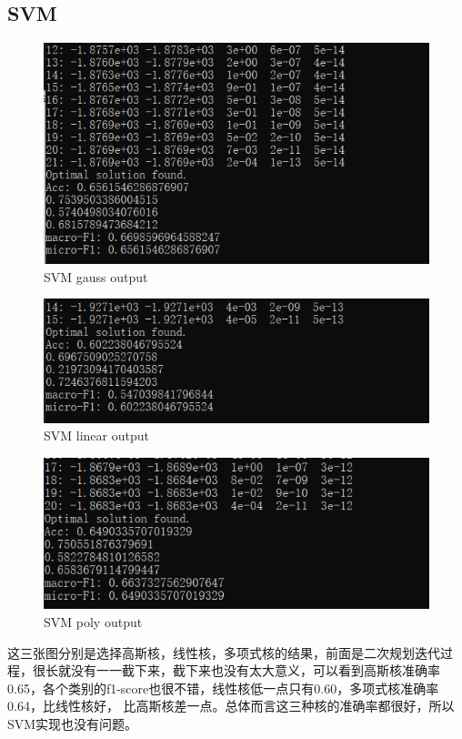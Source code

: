 \documentclass{report}
\begin{document}
    \subsection{SVM}
    \begin{figure}[H]
        \centering
        \includegraphics[width=15cm]{SVM_gauss3.png}
        \caption{SVM gauss output}
    \end{figure}
    \begin{figure}[H]
        \centering
        \includegraphics[width=15cm]{SVM_linear3.png}
        \caption{SVM linear output}
    \end{figure}
    \begin{figure}[H]
        \centering
        \includegraphics[width=15cm]{SVM_poly3.png}
        \caption{SVM poly output}
    \end{figure}
    这三张图分别是选择高斯核，线性核，多项式核的结果，前面是二次规划迭代过程，很长就没有一一截下来，截下来也没有太大意义，可以看到高斯核准确率0.65，各个类别的f1-score也很不错，线性核低一点只有0.60，多项式核准确率0.64，比线性核好，
    比高斯核差一点。总体而言这三种核的准确率都很好，所以SVM实现也没有问题。
\end{document}
